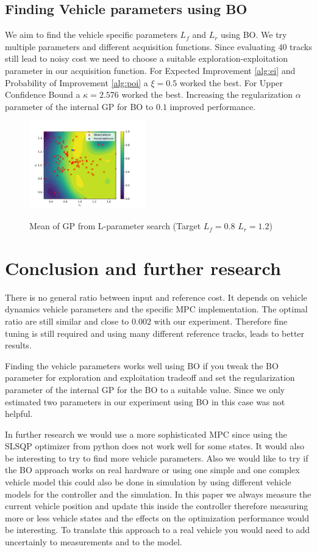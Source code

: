 \documentclass[twoside,twocolumn]{article}
\begin{document}
\subsection{Finding Vehicle parameters using BO}

We aim to find the vehicle specific parameters $L_f$ and $L_r$ using BO. We try multiple parameters and different acquisition functions. Since evaluating $40$ tracks still lead to noisy cost we need to choose a suitable exploration-exploitation parameter in our acquisition function. For Expected Improvement \ref{alg:ei} and Probability of Improvement \ref{alg:poi} a $\xi = 0.5$ worked the best. For Upper Confidence Bound a $\kappa=2.576$ worked the best. Increasing the regularization $\alpha$ parameter of the internal GP for BO to $0.1$ improved performance.

\begin{figure}[h]
    \caption{Mean of GP from L-parameter search (Target $L_f = 0.8$ $L_r = 1.2$)}
    \centering
    \includegraphics[width=0.45\textwidth]{fig_l_estimation_full.pdf}
    \label{fig:l_param_full}
\end{figure}

\section{Conclusion and further research}
There is no general ratio between input and reference cost. It depends on vehicle dynamics vehicle parameters and the specific MPC implementation. The optimal ratio are still similar and close to $0.002$ with our experiment. Therefore fine tuning is still required and using many different reference tracks, leads to better results.

Finding the vehicle parameters works well using BO if you tweak the BO parameter for exploration and exploitation tradeoff and set the regularization parameter of the internal GP for the BO to a suitable value. Since we only estimated two parameters in our experiment using BO in this case was not helpful.

In further research we would use a more sophisticated MPC since using the SLSQP optimizer from python does not work well for some states. It would also be interesting to try to find more vehicle parameters. Also we would like to try if the BO approach works on real hardware or using one simple and one complex vehicle model this could also be done in simulation by using different vehicle models for the controller and the simulation. In this paper we always measure the current vehicle position and update this inside the controller therefore measuring more or less vehicle states and the effects on the optimization performance would be interesting. To translate this approach to a real vehicle you would need to add uncertainly to measurements and to the model.



\end{document}
